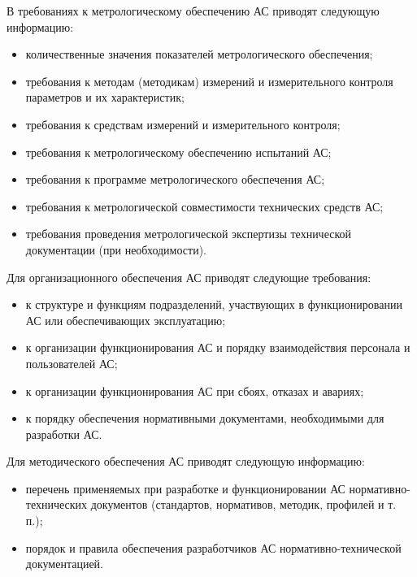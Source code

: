 {\begin{itemize}
\end{itemize}
В требованиях к метрологическому обеспечению АС приводят следующую информацию:
\begin{itemize}
  \item количественные значения показателей метрологического обеспечения;
  \item требования к методам (методикам) измерений и измерительного контроля параметров и их характеристик;
  \item требования к средствам измерений и измерительного контроля;
  \item требования к метрологическому обеспечению испытаний АС;
  \item требования к программе метрологического обеспечения АС;
  \item требования к метрологической совместимости технических средств АС;
  \item требования проведения метрологической экспертизы технической документации (при необходимости).
\end{itemize}
Для организационного обеспечения АС приводят следующие требования:
\begin{itemize}
  \item к структуре и функциям подразделений, участвующих в функционировании АС или обеспечивающих эксплуатацию;
  \item к организации функционирования АС и порядку взаимодействия персонала и пользователей АС;
  \item к организации функционирования АС при сбоях, отказах и авариях;
  \item к порядку обеспечения нормативными документами, необходимыми для разработки АС.
\end{itemize}
Для методического обеспечения АС приводят следующую информацию:
\begin{itemize}
  \item перечень применяемых при разработке и функционировании АС нормативно-технических документов (стандартов, нормативов, методик, профилей и т. п.);
  \item порядок и правила обеспечения разработчиков АС нормативно-технической документацией.
\end{itemize}
}
